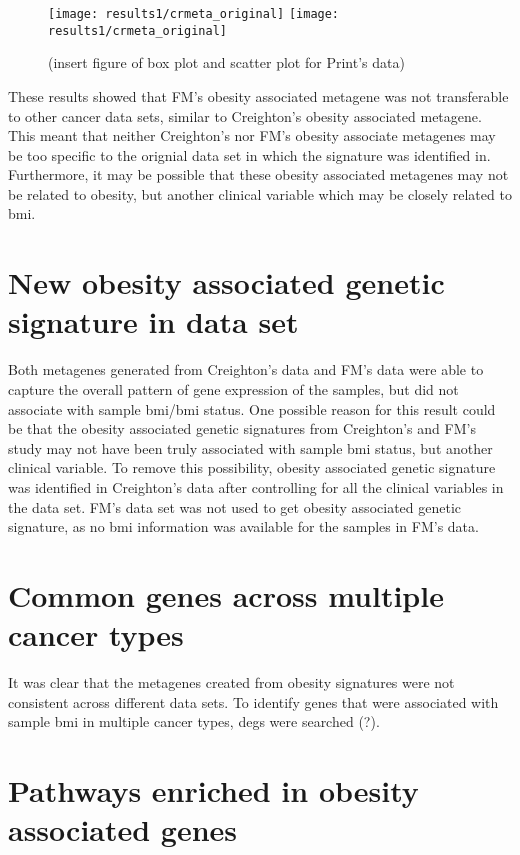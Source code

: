 \begin{figure}[htp!]
	\centering
	\texttt{[image: results1/crmeta\_original]}
	\hfill
	\texttt{[image: results1/crmeta\_original]}
	\caption[FM metagene and sample \gls{bmi}/\gls{bmi} status in Print's data]{(insert figure of box plot and scatter plot for Print's data)}
	\label{fig:fmmetaboxcris1}
\end{figure}

\noindent
These results showed that FM's obesity associated metagene was not transferable to other cancer data sets, similar to Creighton's obesity associated metagene.
This meant that neither Creighton's nor FM's obesity associate metagenes may be too specific to the orignial data set in which the signature was identified in.
Furthermore, it may be possible that these obesity associated metagenes may not be related to obesity, but another clinical variable which may be closely related to \gls{bmi}.

\section{New obesity associated genetic signature in \citet{Creighton2012} data set}
\label{sec:creighton_obesity_metagene_new}

Both metagenes generated from Creighton's data and FM's data were able to capture the overall pattern of gene expression of the samples, but did not associate with sample \gls{bmi}/\gls{bmi} status.
One possible reason for this result could be that the obesity associated genetic signatures from Creighton's and FM's study may not have been truly associated with sample \gls{bmi} status, but another clinical variable.
To remove this possibility, obesity associated genetic signature was identified in Creighton's data after controlling for all the clinical variables in the data set.
FM's data set was not used to get obesity associated genetic signature, as no \gls{bmi} information was available for the samples in FM's data.






\section{Common genes across multiple cancer types}
\label{sec:common_genes_across_multiple_cancer_types}

It was clear that the metagenes created from obesity signatures were not consistent across different data sets.
To identify genes that were associated with sample \gls{bmi} in multiple cancer types, \glspl{deg} were searched (?).







\section{Pathways enriched in obesity associated genes}
\label{sec:pathways_enriched_in_obesity_associated_genes}












